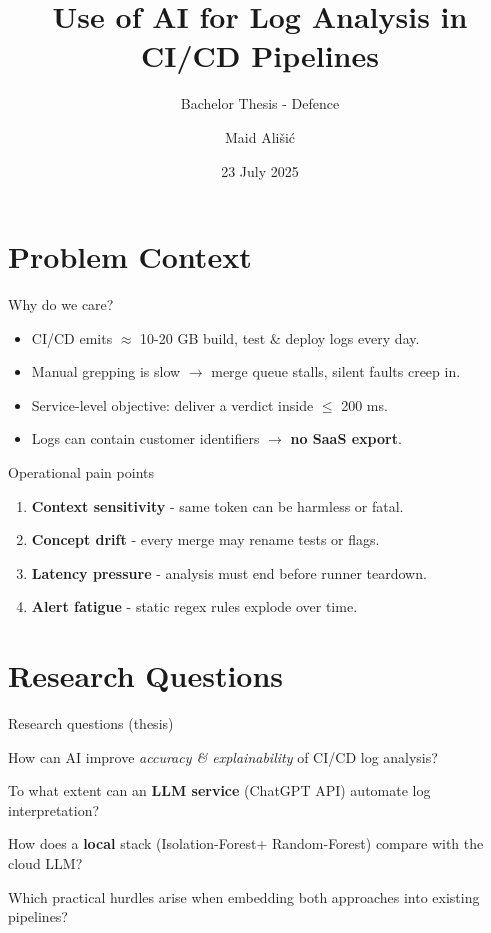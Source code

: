 \documentclass[14pt,aspectratio=169]{beamer}  %
\title{Use of AI for Log Analysis in CI/CD Pipelines}
\subtitle{Bachelor Thesis - Defence}
\author{Maid Ališi\'c}
\institute{University of Applied Sciences Upper Austria, Campus Hagenberg}
\date{23 July 2025}
\newcommand{\IForest}{Isolation-Forest\xspace}
\newcommand{\RForest}{Random-Forest\xspace}
\begin{document}

\maketitle

\section{Problem Context}
\begin{frame}{Why do we care?}
\begin{itemize}[<+->]
  \item CI/CD emits \alert{$\approx$ 10-20 GB} build, test \& deploy logs every day.
  \item Manual grepping is slow $\xrightarrow{}$ merge queue stalls, silent faults creep in.
  \item Service-level objective: deliver a verdict inside \alert{ $\leq$ 200 ms}.
  \item Logs can contain customer identifiers $\xrightarrow{}$ \textbf{no SaaS export}.
\end{itemize}
\end{frame}

\begin{frame}{Operational pain points}
\begin{enumerate}[<+->]
  \item \textbf{Context sensitivity} - same token can be harmless or fatal.
  \item \textbf{Concept drift} - every merge may rename tests or flags.
  \item \textbf{Latency pressure} - analysis must end before runner teardown.
  \item \textbf{Alert fatigue} - static regex rules explode over time.
\end{enumerate}
\end{frame}

\section{Research Questions}
\begin{frame}{Research questions (thesis)}
\begin{description}[<+->]
  \item[RQ\textsubscript{main}] How can AI improve \emph{accuracy \& explainability} of CI/CD log analysis?
  \item[RQ1] To what extent can an \textbf{LLM service} (ChatGPT API) automate log interpretation?
  \item[RQ2] How does a \textbf{local} stack (\IForest + \RForest) compare with the cloud LLM?
  \item[RQ3] Which practical hurdles arise when embedding both approaches into existing pipelines?
\end{description}
\end{frame}
\end{document}
